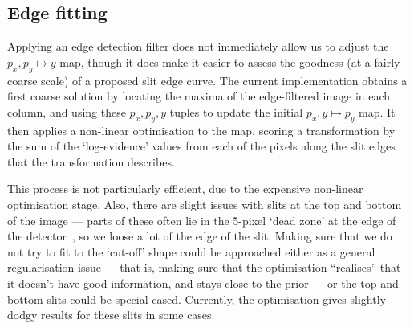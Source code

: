 
\subsection{Edge fitting}

Applying an edge detection filter does not immediately allow us to
adjust the $p_x, p_y \mapsto y$ map, though it does make it easier to
assess the goodness (at a fairly coarse scale) of a proposed slit edge
curve. The current implementation obtains a first coarse solution by
locating the maxima of the edge-filtered image in each column, and using
these $p_x, p_y, y$ tuples to update the initial $p_x, y \mapsto p_y$
map. It then applies a non-linear optimisation to the map, scoring a
transformation by the sum of the `log-evidence' values from each of the
pixels along the slit edges that the transformation describes.

This process is not particularly efficient, due to the expensive
non-linear optimisation stage. Also, there are slight issues with slits
at the top and bottom of the image --- parts of these often lie in the
5-pixel `dead zone' at the edge of the detector~\cite{mosfirepaper}, so we loose a lot of
the edge of the slit. Making sure that we do not try to fit to the
`cut-off' shape could be approached either as a general regularisation
issue --- that is, making sure that the optimisation ``realises'' that
it doesn't have good information, and stays close to the prior ---
or the top and bottom slits could be special-cased. Currently, the
optimisation gives slightly dodgy results for these slits in some cases.

